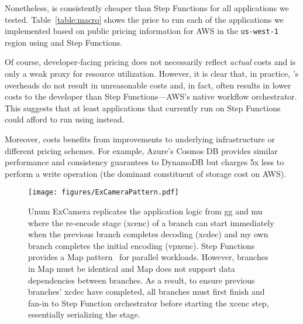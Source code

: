 Nonetheless, \name{} is consistently cheaper than Step Functions for all
applications we tested. Table~\ref{table:macro} shows the price to run each of
the applications we implemented based on public pricing information for AWS in
the \texttt{us-west-1} region using \name{} and Step Functions.


Of course, developer-facing pricing does not necessarily reflect \emph{actual}
costs and is only a weak proxy for resource utilization. However, it is clear
that, in practice, \name{}'s overheads do not result in unreasonable costs and,
in fact, often results in lower costs to the developer than Step
Functions---AWS's native workflow orchestrator. This suggests that at least
applications that currently run on Step Functions could afford to run using
\name{} instead.

Moreover, \name{} costs benefits from improvements to underlying infrastructure
or different pricing schemes. For example, Azure's Cosmos DB provides similar
performance and consistency guarantees to DynamoDB but charges 5x less to
perform a write operation (the dominant constituent of \name{} storage cost on
AWS).



\begin{figure}[t!]
    \centering
    \texttt{[image: figures/ExCameraPattern.pdf]}
    \caption{Unum ExCamera replicates the application logic from gg and mu
     where the re-encode stage (xcenc) of a branch can start immediately when
     the previous branch completes decoding (xcdec) and my own branch
     completes the initial encoding (vpxenc). Step Functions provides a Map
     pattern~\cite{aws-step-functions-map-state} for parallel workloads.
     However, branches in Map must be identical and Map does not support data
     dependencies between branches. As a result, to ensure previous branches'
     xcdec have completed, all branches must first finish and fan-in to Step
     Function orchestrator before starting the xcenc step, essentially
     serializing the stage.}
    \label{fig:excamera-pattern}
\end{figure}


